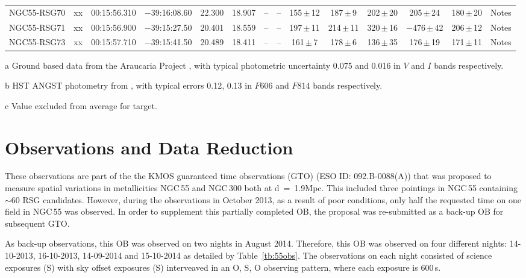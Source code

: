 \begin{table}
\begin{threeparttable}
\begin{tabular}{lrcccccccccccl}
NGC55-RSG70 & xx & 00:15:56.310 & $-$39:16:08.60& 22.300 & 18.907 & --   & --    &   155\,$\pm$\,12 &  187\,$\pm$\,9   &     202\,$\pm$\,20 &   205\,$\pm$\,24             & 180\,$\pm$\,20 & Notes\\
NGC55-RSG71 & xx & 00:15:56.900 & $-$39:15:27.50& 20.401 & 18.559 & --   & --    &   197\,$\pm$\,11 &  214\,$\pm$\,11  &320\,$\pm$\,16\tnote{c}&$-$476\,$\pm$\,42\tnote{c} & 206\,$\pm$\,12 & Notes\\
NGC55-RSG73 & xx & 00:15:57.710 & $-$39:15:41.50& 20.489 & 18.411 & --   & --    &   161\,$\pm$\,7  &  178\,$\pm$\,6   &     136\,$\pm$\,35 &   176\,$\pm$\,19             & 171\,$\pm$\,11 & Notes\\

\hline
\end{tabular}
\begin{tablenotes}
  \item [a] Ground based data from the Araucaria Project
  \protect\cite{2006AJ....132.2556P}, with typical photometric uncertainty 0.075 and 0.016 in $V$ and $I$ bands respectively.
  \item [b] HST ANGST photometry from
  \protect\cite{2009ApJS..183...67D}, with typical errors 0.12, 0.13 in $F606$ and $F814$ bands respectively.
  \item [c] Value excluded from average for target.
\end{tablenotes}
\end{threeparttable}
\end{table}

\section{Observations and Data Reduction} %
\label{sec:ngc55:obs_data}

These observations are part of the the KMOS guaranteed time observations (GTO) (ESO ID: 092.B-0088(A)) that was proposed to measure spatial variations in metallicities NGC\,55 and NGC\,300 both at d~=~1.9\.Mpc.
This included three pointings in NGC\,55 containing $\sim$60 RSG candidates.
However, during the observations in October 2013, as a result of poor conditions, only half the requested time on one field in NGC\,55 was observed.
In order to supplement this partially completed OB, the proposal was re-submitted as a back-up OB for subsequent GTO.

As back-up observations, this OB was observed on two nights in August 2014.
Therefore, this OB was observed on four different nights: 14-10-2013, 16-10-2013, 14-09-2014 and 15-10-2014 as detailed by Table~\ref{tb:55obs}.
The observations on each night consisted of science exposures (S) with sky offset exposures (S) interveaved in an O, S, O observing pattern, where each exposure is 600\,s.

